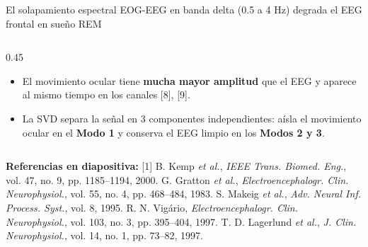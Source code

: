 \documentclass[aspectratio=169,9pt]{beamer}
\begin{document}
\begin{frame}{El solapamiento espectral EOG-EEG en banda delta (0.5 a 4 Hz) degrada el EEG frontal en sue\~no REM}
\begin{columns}[T,onlytextwidth]
\begin{column}{0.45\textwidth}
      \vspace{0.12cm}

      \begin{tcolorbox}[tealcard, title={\scriptsize\bfseries Propuesta: Separaci\'on por Componentes mediante SVD}, colbacktitle=UDTeal!85!black, coltitle=white]
        \scriptsize
        \begin{itemize}
          \item El movimiento ocular tiene \textbf{mucha mayor amplitud} que el EEG y aparece al mismo tiempo en los canales [8], [9].
          \item La SVD separa la se\~nal en 3 componentes independientes: a\'isla el movimiento ocular en el \textbf{Modo 1} y conserva el EEG limpio en los \textbf{Modos 2 y 3}.
        \end{itemize}
      \end{tcolorbox}
    \end{column}
  \end{columns}

  \vspace{0.08cm}
  {\tiny\color{MutedGray}\textbf{Referencias en diapositiva:} [1] B. Kemp \textit{et al.}, \textit{IEEE Trans. Biomed. Eng.}, vol. 47, no. 9, pp. 1185--1194, 2000. \quad [2] G. Gratton \textit{et al.}, \textit{Electroencephalogr. Clin. Neurophysiol.}, vol. 55, no. 4, pp. 468--484, 1983. \quad [4] S. Makeig \textit{et al.}, \textit{Adv. Neural Inf. Process. Syst.}, vol. 8, 1995. \quad [5] R. N. Vig\'ario, \textit{Electroencephalogr. Clin. Neurophysiol.}, vol. 103, no. 3, pp. 395--404, 1997. \quad [8] T. D. Lagerlund \textit{et al.}, \textit{J. Clin. Neurophysiol.}, vol. 14, no. 1, pp. 73--82, 1997.}
\end{frame}
\end{document}
